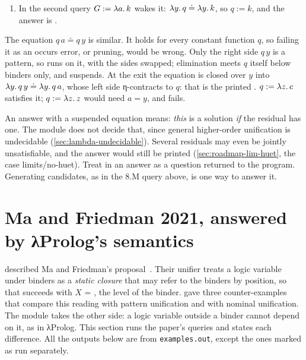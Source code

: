 {\begin{tutorial}[why \texttt{q = G (H y)} must wait]
\begin{enumerate}
  \item In the second query $G:=\lambda a.\,k$ wakes it: $\lambda y.\,q\doteq\lambda y.\,k$, so $q:=k$, and the
    answer is .
\end{enumerate}
The equation $q\,a\doteq q\,y$ is similar. It holds for every constant function $q$, so failing it as an
occurs error, or pruning, would be wrong. Only the right side $q\,y$ is a pattern, so 
runs  on it, with the sides swapped; elimination meets $q$ itself below binders only, and
suspends. At the exit the equation is closed over $y$ into $\lambda y.\,q\,y\doteq\lambda y.\,q\,a$, whose left
side η-contracts to $q$: that is the printed . $q:=\lambda z.\,c$ satisfies it; $q:=\lambda z.\,z$ would need $a=y$, and fails.
\end{tutorial}

\begin{pitfall}
An answer with a suspended equation means: \emph{this} is a solution \emph{if} the residual has one.
The module does not decide that, since general higher-order unification is undecidable
(\cref{sec:lambda-undecidable}). Several residuals may even be jointly unsatisfiable, and the answer
would still be printed (\cref{sec:roadmap-lim-huet}, the case limits/no-huet). Treat  in an answer
as a question returned to the program. Generating candidates, as in the 8.M query above, is one way
to answer it.
\end{pitfall}

\section{Ma and Friedman 2021, answered by λProlog's semantics}\label{sec:examples-mf}

 described Ma and Friedman's proposal~\cite{MaFriedman2021}. Their unifier
treats a logic variable under binders as a \emph{static closure} that may refer to the binders by
position, so that  succeeds with $X$ = , the level of the
binder.  gave three counter-examples that compare this reading with
pattern unification and with nominal unification. The module takes the other side: a logic variable
outside a binder cannot depend on it, as in λProlog. This section runs the paper's queries and states
each difference. All the outputs below are from \texttt{examples.out}, except the ones marked as run
separately.

}
